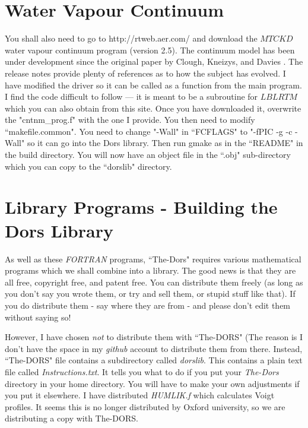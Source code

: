 \documentclass[12pt]{article}
\begin{document}
\section{Water Vapour Continuum}

You shall also need to go to http://rtweb.aer.com/ and download the $MT CKD$ water vapour continuum program (version 2.5). The continuum model has been under development since the original paper by Clough, Kneizys, and Davies \cite{MTCKD:Mybib}. The release notes provide plenty of references as to how the subject has evolved. I have modified the driver so it can be called
as a function from the main program. I find the code difficult to follow --- it is meant to be a subroutine for $LBLRTM$
which you can also obtain from this site. Once you have downloaded it, overwrite the "cntnm\_prog.f"  with the one I provide.
You then need to modify ``makefile.common". You need to change "-Wall" in ``FCFLAGS"  to "-fPIC -g -c -Wall" so it can go into the Dors library. Then run gmake as in the ``README" in the build directory. You will now have an object file in the ``.obj"
 sub-directory which you can copy to the ``dorslib" directory.


\section{Library Programs - Building the Dors Library}

As well as these {\it FORTRAN} programs, ``The-Dors" requires various mathematical programs which we shall
 combine into a library. The good news is
that they are all free, copyright free, and patent free. You can distribute them freely (as long as you don't say you wrote
 them, or try and sell them,  or stupid stuff like that). If you do distribute them - say where they are from - and please don't edit them without saying so!  

However, I have chosen {\it not} to distribute
them with ``The-DORS" (The reason is I don't have the space in my {\it github} account to distribute
them from there.  Instead, ``The-DORS" file contains a subdirectory called  {\it dorslib}.
This contains a plain text file called {\it Instructions.txt}. It tells you what to do if you put your {\it The-Dors}
directory in your home directory. You will have to make your own adjustments if you put it elsewhere.
I have distributed {\it HUMLIK.f} \cite{BobWells:MyBib} which calculates Voigt profiles. It seems this is no longer
distributed by Oxford university, so we are distributing a copy with The-DORS.
\end{document}
